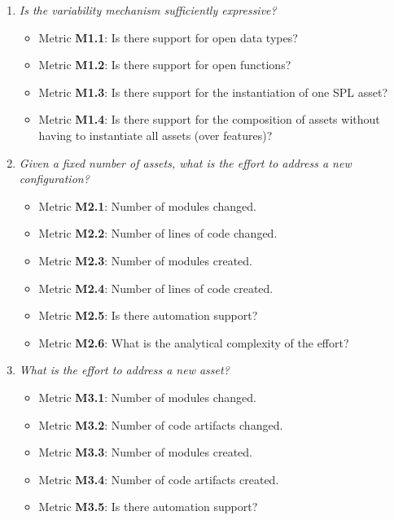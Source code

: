\begin{enumerate}[Q1]
\item \emph{Is the variability mechanism sufficiently expressive?}
\begin{itemize}
\item Metric \textbf{M1.1}: Is there support for open data types?
\item Metric \textbf{M1.2}: Is there support for open functions?
\item Metric \textbf{M1.3}: Is there support for the instantiation of one SPL asset?
\item Metric \textbf{M1.4}: Is there support for the composition of assets without having to instantiate all assets (over features)?
\end{itemize}

\item \emph{Given a fixed number of assets, what is the effort to address a new configuration?}
\begin{itemize}
\item Metric \textbf{M2.1}: Number of modules changed.
\item Metric \textbf{M2.2}: Number of lines of code changed.
\item Metric \textbf{M2.3}: Number of modules created.
\item Metric \textbf{M2.4}: Number of lines of code created.
\item Metric \textbf{M2.5}: Is there automation support?
\item Metric \textbf{M2.6}: What is the analytical complexity of the effort?
\end{itemize}

\item \emph{What is the effort to address a new asset?}
\begin{itemize}
\item Metric \textbf{M3.1}: Number of modules changed.
\item Metric \textbf{M3.2}: Number of code artifacts changed.
\item Metric \textbf{M3.3}: Number of modules created.
\item Metric \textbf{M3.4}: Number of code artifacts created.
\item Metric \textbf{M3.5}: Is there automation support?
\end{itemize}


\end{enumerate}
